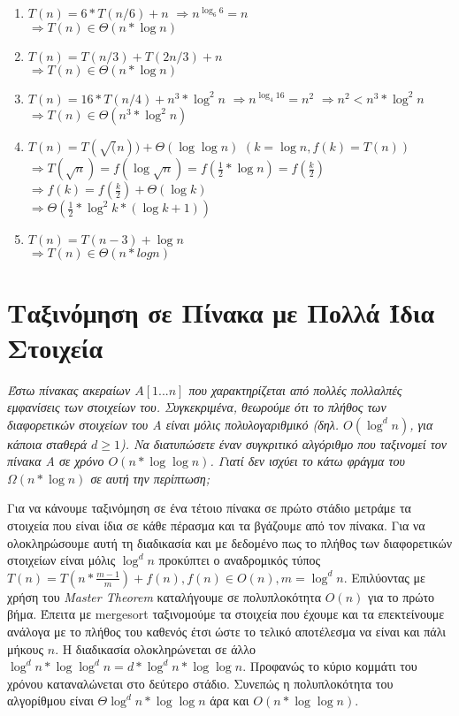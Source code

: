 \documentclass[a4paper,10pt]{article} \usepackage{anysize}
\begin{document}
\begin{enumerate}
\begin{enumerate}
\item $T(n) = 6*T(n/6)+n$
$\Rightarrow n^{\log _6 {6}} = n$\\
$\Rightarrow T(n) \in \Theta(n*\log {n})$

\item $T(n) = T(n/3) + T(2n/3) + n$\\
$\Rightarrow T(n) \in \Theta(n*\log{n})$

\item $T(n) = 16*T(n/4) + n^3*\log^2{n}$
$\Rightarrow n^{\log _4{16}} = n^2$
$\Rightarrow n^2 < n^3*\log^2{n}$\\
$\Rightarrow T(n) \in \Theta(n^3*\log^2{n})$

\item $T(n) = T(\sqrt(n)) + \Theta(\log{\log{n}})$
$(k=\log{n},f(k)=T(n))$\\
$\Rightarrow
T(\sqrt{n})=f(\log{\sqrt{n}})=f(\frac{1}{2}*\log{n})=f(\frac{k}{2}) $\\
$\Rightarrow f(k)=f(\frac{k}{2})+\Theta(\log{k})$\\
$\Rightarrow \Theta(\frac{1}{2}*\log^2{k}*(\log{k}+1))$

\item $T(n) = T(n-3) + \log{n}$\\
$\Rightarrow T(n) \in \Theta(n*logn)$

\end{enumerate}
\end{enumerate}
\pagebreak
\section{Ταξινόμηση σε Πίνακα με Πολλά Ίδια Στοιχεία}
\textit{Έστω πίνακας ακεραίων $A[1...n]$ που χαρακτηρίζεται από πολλές
πολλαλπές εμφανίσεις των στοιχείων του. Συγκεκριμένα, θεωρούμε ότι το πλήθος
των διαφορετικών στοιχείων του Α είναι μόλις πολυλογαριθμικό (δηλ.
$O(\log^d{n})$, για κάποια σταθερά $d \geq 1$). Να διατυπώσετε έναν συγκριτικό
αλγόριθμο που ταξινομεί τον πίνακα Α σε χρόνο $O(n*\log{\log{n}})$. Γιατί δεν
ισχύει το κάτω φράγμα του $\Omega({n*\log{n}})$ σε αυτή την περίπτωση;} \vspace{0.4cm}

Για να κάνουμε ταξινόμηση σε ένα τέτοιο πίνακα σε πρώτο στάδιο μετράμε τα
στοιχεία που είναι ίδια σε κάθε πέρασμα και τα βγάζουμε από τον πίνακα. Για να
ολοκληρώσουμε αυτή τη διαδικασία και με δεδομένο πως το πλήθος των
διαφορετικών στοιχείων είναι μόλις $\log^d{n}$ προκύπτει ο αναδρομικός τύπος
$T(n)=T(n*\frac{m-1}{m})+f(n),f(n) \in O(n),m=\log^d{n}$. Επιλύοντας με χρήση
του \textit{Master Theorem} καταλήγουμε σε πολυπλοκότητα $O(n)$ για το πρώτο
βήμα. Έπειτα με mergesort ταξινομούμε τα στοιχεία που έχουμε και τα
επεκτείνουμε ανάλογα με το πλήθος του καθενός έτσι ώστε το τελικό αποτέλεσμα 
να είναι και πάλι μήκους $n$. Η διαδικασία ολοκληρώνεται σε άλλο
$\log^d{n}*\log{\log^d{n}}=d*\log^d{n}*\log{\log{n}}$. Προφανώς το κύριο
κομμάτι του χρόνου  καταναλώνεται στο δεύτερο στάδιο. Συνεπώς η πολυπλοκότητα
του αλγορίθμου είναι $\Theta{\log^d{n}*\log{\log{n}} }$ άρα και
$O(n*\log{\log{n}})$.
\end{document}
